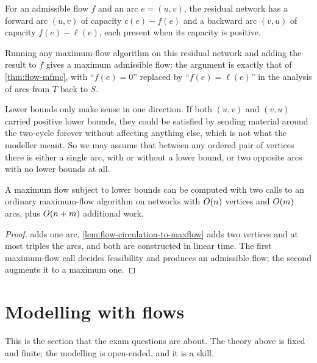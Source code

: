 \begin{definition}
For an admissible flow $f$ and an arc $e = (u,v)$, the residual network has a
forward arc $(u,v)$ of capacity $c(e) - f(e)$ and a backward arc $(v,u)$ of
capacity $f(e) - \ell(e)$, each present when its capacity is positive.
\end{definition}

Running any maximum-flow algorithm on this residual network and adding the
result to $f$ gives a maximum admissible flow: the argument is exactly that of
\cref{thm:flow-mfmc}, with ``$f(e) = 0$'' replaced by ``$f(e) = \ell(e)$''
in the analysis of arcs from $T$ back to $S$.

\begin{remark}
Lower bounds only make sense in one direction. If both $(u,v)$ and $(v,u)$
carried positive lower bounds, they could be satisfied by sending material
around the two-cycle forever without affecting anything else, which is not what
the modeller meant. So we may assume that between any ordered pair of vertices
there is either a single arc, with or without a lower bound, or two opposite
arcs with no lower bounds at all.
\end{remark}

\begin{theorem}\label{thm:flow-lower-bounds}
A maximum flow subject to lower bounds can be computed with two calls to an
ordinary maximum-flow algorithm on networks with $O\!\left(n\right)$ vertices and
$O\!\left(m\right)$ arcs, plus $O\!\left(n+m\right)$ additional work.
\end{theorem}

\begin{proof}
 adds one arc, \cref{lem:flow-circulation-to-maxflow}
adds two vertices and at most triples the arcs, and both are constructed in
linear time. The first maximum-flow call decides feasibility and produces an
admissible flow; the second augments it to a maximum one.
\end{proof}

\section{Modelling with flows}
\label{sec:flow-modelling}

This is the section that the exam questions are about. The theory above is
fixed and finite; the modelling is open-ended, and it is a skill.

